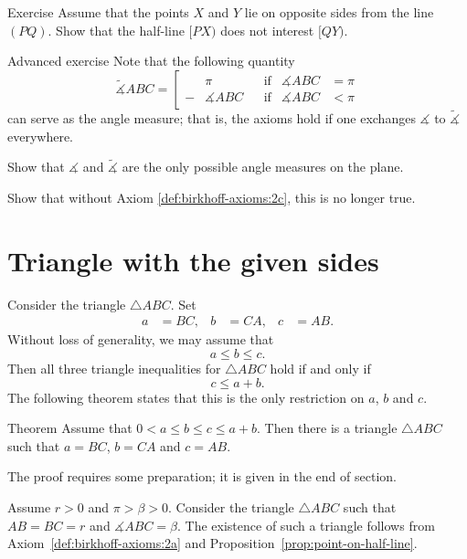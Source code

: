 \begin{thm}{Exercise}\label{ex:Z}
Assume that the points $X$ and $Y$ lie on opposite sides from the line $(PQ)$.
Show that the half-line $[PX)$ does not interest $[QY)$. 
\end{thm}

\begin{thm}{Advanced exercise}\label{ex:angle-measures}
Note that the following quantity 
$$\tilde\measuredangle ABC=\left[
\begin{aligned}
&\pi&&\text{if}&\measuredangle ABC&=\pi
\\
-&\measuredangle ABC&&\text{if}&\measuredangle ABC&<\pi
\end{aligned}
\right.$$
can serve as the angle measure; 
that is, the axioms hold if one exchanges $\measuredangle$ to $\tilde\measuredangle$ everywhere.

Show that $\measuredangle$ and $\tilde\measuredangle$ are the only possible angle measures on the plane. 

Show that without Axiom \ref{def:birkhoff-axioms:2c}, this is no longer true.
\end{thm}
 


\section*{Triangle with the given sides}

Consider the triangle $\triangle ABC$.
Set 
\begin{align*}
a&=BC,
&
b&=CA,
&
c&=AB.
\end{align*}
Without loss of generality, we may assume that 
\[a\le b \le c.\]
Then all three triangle inequalities for $\triangle ABC$
hold if and only if 
\[c\le a+b.\]
The following theorem states that this is the only restriction on $a$, $b$ and $c$.

\begin{thm}{Theorem}\label{thm:abc}
Assume that $0<a\le b\le c\le a+b$.
Then there is a triangle $\triangle ABC$ 
such that $a=BC$, $b=CA$ and $c=AB$.
\end{thm}

The proof requires some preparation;
it is given in the end of section.

Assume $r>0$ and $\pi>\beta>0$.
Consider the triangle $\triangle ABC$ such that 
$AB=BC=r$ and $\measuredangle ABC=\beta$.
The existence of such a triangle follows from Axiom~\ref{def:birkhoff-axioms:2a} and Proposition~\ref{prop:point-on-half-line}.

